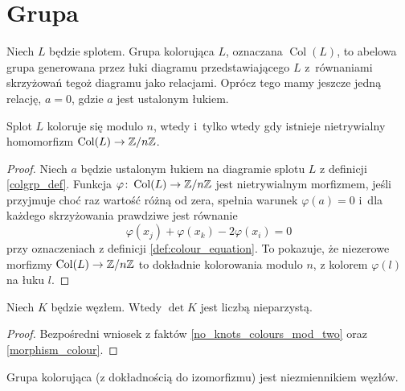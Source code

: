 \section{Grupa} %
\label{sec:section_name}
\begin{definition} \label{colgrp_def}
    Niech $L$ będzie splotem.
    Grupa kolorująca $L$, oznaczana $\operatorname{Col}(L)$, to abelowa grupa generowana przez łuki diagramu przedstawiającego $L$ z~równaniami skrzyżowań tegoż diagramu jako relacjami.
    Oprócz tego mamy jeszcze jedną relację, $a = 0$, gdzie $a$ jest ustalonym łukiem.
\end{definition}

\begin{proposition} \label{morphism_colour}
    Splot $L$ koloruje się modulo $n$, wtedy i~tylko wtedy gdy istnieje nietrywialny homomorfizm $\operatorname{Col}(L) \to \mathbb Z/n\mathbb Z$.
\end{proposition}

\begin{proof}
    Niech $a$ będzie ustalonym łukiem na diagramie splotu $L$ z definicji \ref{colgrp_def}.
    Funkcja $\varphi \colon \operatorname{Col}(L) \to \mathbb Z/n\mathbb Z$ jest nietrywialnym morfizmem, jeśli przyjmuje choć raz wartość różną od zera, spełnia warunek $\varphi(a) = 0$ i~dla każdego skrzyżowania prawdziwe jest równanie
    \begin{equation}
        \varphi(x_j) + \varphi(x_k) - 2\varphi(x_i) = 0
    \end{equation}
    przy oznaczeniach z definicji \ref{def:colour_equation}.
    To pokazuje, że niezerowe morfizmy $\operatorname{Col}(L) \to \mathbb Z/n\mathbb Z$ to dokładnie kolorowania modulo $n$, z kolorem $\varphi(l)$ na łuku $l$.
\end{proof}

\begin{corollary} \label{odd_determinant}
    Niech $K$ będzie węzłem.
    Wtedy $\det K$ jest liczbą nieparzystą.
\end{corollary}

\begin{proof}
    Bezpośredni wniosek z faktów \ref{no_knots_colours_mod_two} oraz \ref{morphism_colour}.
\end{proof}

\begin{proposition}
    Grupa kolorująca (z dokładnością do izomorfizmu) jest niezmiennikiem węzłów.
\end{proposition}

